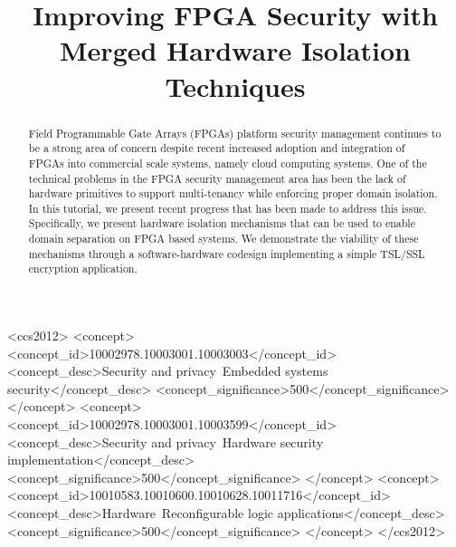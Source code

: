 \documentclass[sigconf]{acmart}
\theoremstyle{plain}
\theoremstyle{remark}
\begin{document}
\title{Improving FPGA Security with Merged Hardware Isolation Techniques}
%
%
%
%

\begin{abstract}
Field Programmable Gate Arrays (FPGAs) platform security management continues to be a strong area of concern despite recent increased adoption and integration of FPGAs into commercial scale systems, namely cloud computing systems. One of the technical problems in the FPGA security management area has been the lack of hardware primitives to support multi-tenancy while enforcing proper domain isolation. In this tutorial, we present recent progress that has been made to address this issue. Specifically, we present hardware isolation mechanisms that can be used to enable domain separation on FPGA based systems. We demonstrate the viability of these mechanisms through a software-hardware codesign implementing a simple TSL/SSL encryption application.
\end{abstract}

\begin{CCSXML}
<ccs2012>
<concept>
<concept_id>10002978.10003001.10003003</concept_id>
<concept_desc>Security and privacy~Embedded systems security</concept_desc>
<concept_significance>500</concept_significance>
</concept>
<concept>
<concept_id>10002978.10003001.10003599</concept_id>
<concept_desc>Security and privacy~Hardware security implementation</concept_desc>
<concept_significance>500</concept_significance>
</concept>
<concept>
<concept_id>10010583.10010600.10010628.10011716</concept_id>
<concept_desc>Hardware~Reconfigurable logic applications</concept_desc>
<concept_significance>500</concept_significance>
</concept>
</ccs2012>
\end{CCSXML}

\end{document}
